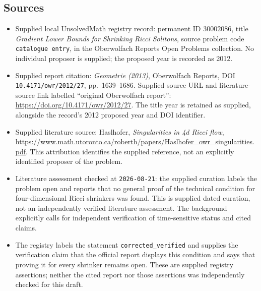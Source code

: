 \documentclass[11pt]{article}
\begin{document}
\subsection{Sources}
\begin{itemize}
\item Supplied local UnsolvedMath registry record: permanent ID \(30002086\), title \emph{Gradient Lower Bounds for Shrinking Ricci Solitons}, source problem code \texttt{catalogue entry}, in the Oberwolfach Reports Open Problems collection. No individual proposer is supplied; the proposed year is recorded as 2012.
\item Supplied report citation: \emph{Geometrie (2013)}, Oberwolfach Reports, DOI \texttt{10.4171/owr/2012/27}, pp.\ 1639--1686. Supplied source URL and literature-source link labelled ``original Oberwolfach report'': \url{https://doi.org/10.4171/owr/2012/27}. The title year is retained as supplied, alongside the record's 2012 proposed year and DOI identifier.
\item Supplied literature source: Haslhofer, \emph{Singularities in 4d Ricci flow}, \url{https://www.math.utoronto.ca/roberth/papers/Haslhofer_owr_singularities.pdf}. This attribution identifies the supplied reference, not an explicitly identified proposer of the problem.
\item Literature assessment checked at \texttt{2026-08-21}: the supplied curation labels the problem open and reports that no general proof of the technical condition for four-dimensional Ricci shrinkers was found. This is supplied dated curation, not an independently verified literature assessment. The background explicitly calls for independent verification of time-sensitive status and cited claims.
\item The registry labels the statement \texttt{corrected\_verified} and supplies the verification claim that the official report displays this condition and says that proving it for every shrinker remains open. These are supplied registry assertions; neither the cited report nor those assertions was independently checked for this draft.
\end{itemize}
\end{document}
